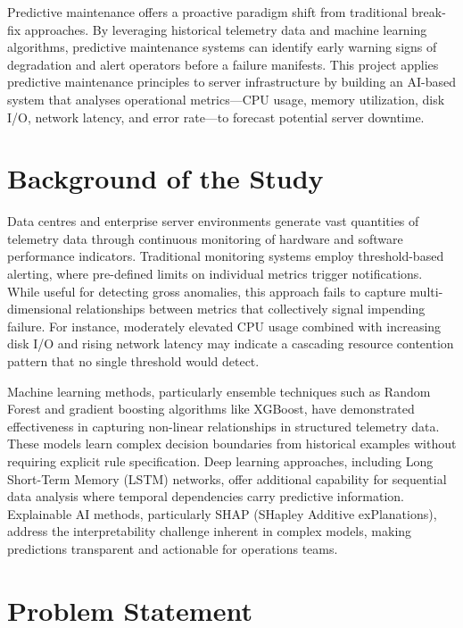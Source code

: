 \documentclass[12pt,letterpaper]{report}
\begin{document}
Predictive maintenance offers a proactive paradigm shift from traditional break-fix approaches. By leveraging historical telemetry data and machine learning algorithms, predictive maintenance systems can identify early warning signs of degradation and alert operators before a failure manifests. This project applies predictive maintenance principles to server infrastructure by building an AI-based system that analyses operational metrics---CPU usage, memory utilization, disk I/O, network latency, and error rate---to forecast potential server downtime.

\section{Background of the Study}

Data centres and enterprise server environments generate vast quantities of telemetry data through continuous monitoring of hardware and software performance indicators. Traditional monitoring systems employ threshold-based alerting, where pre-defined limits on individual metrics trigger notifications. While useful for detecting gross anomalies, this approach fails to capture multi-dimensional relationships between metrics that collectively signal impending failure. For instance, moderately elevated CPU usage combined with increasing disk I/O and rising network latency may indicate a cascading resource contention pattern that no single threshold would detect.

Machine learning methods, particularly ensemble techniques such as Random Forest and gradient boosting algorithms like XGBoost, have demonstrated effectiveness in capturing non-linear relationships in structured telemetry data. These models learn complex decision boundaries from historical examples without requiring explicit rule specification. Deep learning approaches, including Long Short-Term Memory (LSTM) networks, offer additional capability for sequential data analysis where temporal dependencies carry predictive information. Explainable AI methods, particularly SHAP (SHapley Additive exPlanations), address the interpretability challenge inherent in complex models, making predictions transparent and actionable for operations teams.

\section{Problem Statement}
\end{document}
